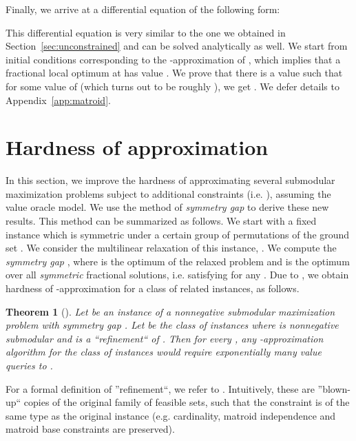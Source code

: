 \documentclass{article}[11pt]
\newtheorem{theorem}{Theorem}[section]
\begin{document}
Finally, we arrive at a differential equation of the following form:

This differential equation is very similar to the one we obtained in 
Section~\ref{sec:unconstrained} and can be solved analytically as well.
We start from initial conditions corresponding to the -approximation
of \cite{Vondrak09}, which implies that 
a fractional local optimum at  has value
. We prove that there is a value
 such that
for some value of  (which turns out to be roughly ),
we get . We defer details to Appendix~\ref{app:matroid}.





\section{Hardness of approximation} 
\label{sec:hardness}

In this section, we improve the hardness of approximating several submodular maximization
problems subject to additional constraints (i.e. ),
assuming the value oracle model. We use the method of {\em symmetry gap}
\cite{Vondrak09} to derive these new results. 
This method can be summarized as follows.
We start with a fixed instance  which is symmetric
under a certain group of permutations of the ground set . We consider
the multilinear relaxation of this instance, .
We compute the {\em symmetry gap} ,
where  is the optimum of the relaxed
problem and  is the optimum
over all {\em symmetric} fractional solutions, i.e. satisfying 
for any . Due to \cite[Theorem 1.6]{Vondrak09}, we obtain hardness
of -approximation for a class of related instances, as follows.

\begin{theorem}[\cite{Vondrak09}]
\label{thm:symmetrygap}
Let  be an instance of a nonnegative submodular
maximization problem with symmetry gap .
Let  be the class of instances 
where  is nonnegative submodular and  is a ``refinement``
of . Then for every , any -approximation algorithm
for the class of instances  would require exponentially many value queries
to . 
\end{theorem}

For a formal definition of ''refinement``, we refer to \cite[Definition 1.5]{Vondrak09}.
Intuitively, these are ''blown-up`` copies of the original family of feasible sets,
such that the constraint is of the same type as the original instance (e.g. cardinality,
matroid independence and matroid base constraints are preserved).
\end{document}
